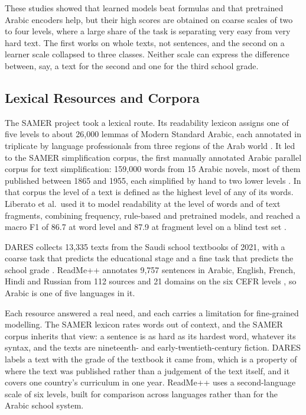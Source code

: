 These studies showed that learned models beat formulas and that pretrained Arabic encoders help,
but their high scores are obtained on coarse scales of two to four levels, where a large share of
the task is separating very easy from very hard text. The first works on whole texts, not
sentences, and the second on a learner scale collapsed to three classes. Neither scale can
express the difference between, say, a text for the second and one for the third school grade.

\subsection{Lexical Resources and Corpora}

The SAMER project took a lexical route. Its readability lexicon assigns one of five levels to
about 26{,}000 lemmas of Modern Standard Arabic, each annotated in triplicate by language
professionals from three regions of the Arab world \cite{alkhalil2020samer}. It led to the SAMER
simplification corpus, the first manually annotated Arabic parallel corpus for text
simplification: 159{,}000 words from 15 Arabic novels, most of them published between 1865 and
1955, each simplified by hand to two lower levels \cite{alhafni2024samer}. In that corpus the
level of a text is defined as the highest level of any of its words. Liberato et al.\ used it to
model readability at the level of words and of text fragments, combining frequency, rule-based
and pretrained models, and reached a macro F1 of 86.7 at word level and 87.9 at fragment level on
a blind test set \cite{liberato2024strategies}.

DARES collects 13{,}335 texts from the Saudi school textbooks of 2021, with a coarse task that
predicts the educational stage and a fine task that predicts the school grade
\cite{elhaj2024dares}. ReadMe++ annotates 9{,}757 sentences in Arabic, English, French, Hindi and
Russian from 112 sources and 21 domains on the six CEFR levels \cite{naous2024readme}, so Arabic
is one of five languages in it.

Each resource answered a real need, and each carries a limitation for fine-grained modelling.
The SAMER lexicon rates words out of context, and the SAMER corpus inherits that view: a sentence
is as hard as its hardest word, whatever its syntax, and the texts are nineteenth- and
early-twentieth-century fiction. DARES labels a text with the grade of the textbook it came from,
which is a property of where the text was published rather than a judgement of the text itself,
and it covers one country's curriculum in one year. ReadMe++ uses a second-language scale of six
levels, built for comparison across languages rather than for the Arabic school system.

